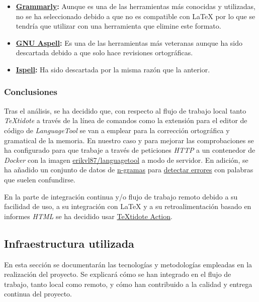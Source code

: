 \begin{itemize}
    \item \textbf{\href{https://www.grammarly.com/}{Grammarly}:} Aunque es una de las herramientas más conocidas y utilizadas, no se ha seleccionado debido a que no es compatible con \LaTeX{} por lo que se tendría que utilizar con una herramienta que elimine este formato.
    \item \textbf{\href{http://aspell.net/}{GNU Aspell}:} Es una de las herramientas más veteranas aunque ha sido descartada debido a que solo hace revisiones ortográficas.
    \item \textbf{\href{https://www.cs.hmc.edu/~geoff/ispell.html}{Ispell}:} Ha sido descartada por la misma razón que la anterior.
\end{itemize}

\subsubsection{Conclusiones}

Tras el análisis, se ha decidido que, con respecto al flujo de trabajo local tanto \textit{TeXtidote} a través de la línea de comandos como la extensión para el editor de código de \textit{LanguageTool} se van a emplear para la corrección ortográfica y gramatical de la memoria. En nuestro caso y para mejorar las comprobaciones se ha configurado para que trabaje a través de peticiones \textit{HTTP} a un contenedor de \textit{Docker} con la imagen \href{https://hub.docker.com/r/erikvl87/languagetool}{erikvl87/languagetool} a modo de servidor. En adición, se ha añadido un conjunto de datos de \href{https://es.wikipedia.org/wiki/N-grama}{n-gramas} para \href{https://dev.languagetool.org/finding-errors-using-n-gram-data}{detectar errores} con palabras que suelen confundirse.

En la parte de integración continua y/o flujo de trabajo remoto debido a su facilidad de uso, a su integración con \LaTeX{} y a su retroalimentación basado en informes \textit{HTML} se ha decidido usar \href{https://github.com/marketplace/actions/textidote-action}{TeXtidote Action}.

\subsection{Infraestructura utilizada}

En esta sección se documentarán las tecnologías y metodologías empleadas en la realización del proyecto. Se explicará cómo se han integrado en el flujo de trabajo, tanto local como remoto, y cómo han contribuido a la calidad y entrega continua del proyecto.

